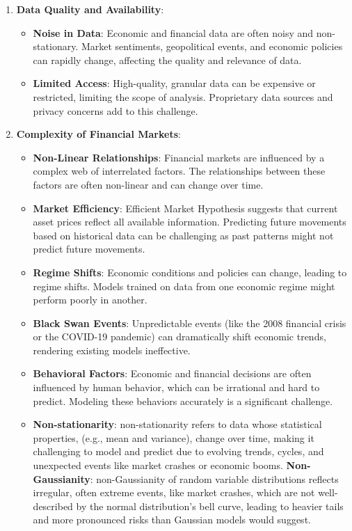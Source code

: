 \documentclass[11pt, reqno]{amsart}
\theoremstyle{definition}
\theoremstyle{remark}
\begin{document}
	\begin{enumerate}
		\item \textbf{Data Quality and Availability}:
			\begin{itemize}
				\item \textbf{Noise in Data}: Economic and financial data are often
					noisy and non-stationary. Market sentiments, geopolitical events,
					and economic policies can rapidly change, affecting the quality and
					relevance of data.

				\item \textbf{Limited Access}: High-quality, granular data can be
					expensive or restricted, limiting the scope of analysis.
					Proprietary data sources and privacy concerns add to this
					challenge.
			\end{itemize}

		\item \textbf{Complexity of Financial Markets}:
			\begin{itemize}
				\item \textbf{Non-Linear Relationships}: Financial markets are influenced
					by a complex web of interrelated factors. The relationships
					between these factors are often non-linear and can change over
					time.

				\item \textbf{Market Efficiency}: Efficient Market Hypothesis suggests
					that current asset prices reflect all available information.
					Predicting future movements based on historical data can be
					challenging as past patterns might not predict future movements.

				\item \textbf{Regime Shifts}: Economic conditions and policies can change,
					leading to regime shifts. Models trained on data from one economic
					regime might perform poorly in another.

				\item \textbf{Black Swan Events}: Unpredictable events (like the
					2008 financial crisis or the COVID-19 pandemic) can dramatically shift
					economic trends, rendering existing models ineffective.

				\item \textbf{Behavioral Factors}: Economic and financial decisions
					are often influenced by human behavior, which can be irrational
					and hard to predict. Modeling these behaviors accurately is a significant
					challenge.

				\item \textbf{Non-stationarity}: non-stationarity refers to data whose
					statistical properties, (e.g., mean and variance), change over time,
					making it challenging to model and predict due to evolving trends,
					cycles, and unexpected events like market crashes or economic
					booms. \textbf{Non-Gaussianity}: non-Gaussianity of random variable
					distributions reflects irregular, often extreme events, like market
					crashes, which are not well-described by the normal distribution's
					bell curve, leading to heavier tails and more pronounced risks than
					Gaussian models would suggest.
			\end{itemize}


\end{enumerate}
\end{document}
